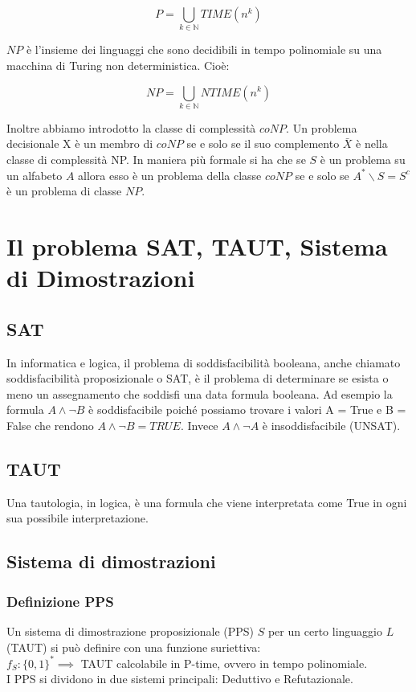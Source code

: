 \documentclass[it]{article}
\begin{document}
	$$ P = \bigcup\limits_{k \in \mathbb{N}}TIME(n^k) $$

$ {\displaystyle NP} $ è l'insieme dei linguaggi che sono decidibili in tempo polinomiale su una macchina di Turing non deterministica. Cioè:

    $$ NP = \bigcup\limits_{k \in \mathbb{N}}NTIME(n^k) $$
    
Inoltre abbiamo introdotto la classe di complessità $ {\displaystyle coNP} $. Un problema decisionale X è un membro di $ {\displaystyle coNP} $ se e solo se il suo complemento $ \bar{X} $ è nella classe di complessità NP. In maniera più formale si ha che se $ {\displaystyle S} $ è un problema su un alfabeto $ {\displaystyle A} $ allora esso è un problema della classe $ {\displaystyle coNP} $ se e solo se $ {\displaystyle A^{*}\backslash S=S^{c}} $ è un problema di classe $ {\displaystyle NP}$. 

\section{Il problema SAT, TAUT, Sistema di Dimostrazioni}
    \subsection{SAT}
    In informatica e logica, il problema di soddisfacibilità booleana, anche chiamato soddisfacibilità proposizionale o SAT, è il problema di determinare se esista o meno un assegnamento che soddisfi una data formula booleana. Ad esempio la formula $A \land \lnot B$ è soddisfacibile poiché possiamo trovare i valori A = True e B = False che rendono $A \land \lnot B = TRUE$. Invece $A \land \lnot A$ è insoddisfacibile (UNSAT).
    \subsection{TAUT}
    Una tautologia, in logica, è una formula che viene interpretata come True in ogni sua possibile interpretazione.
    \subsection{Sistema di dimostrazioni}
        \subsubsection{Definizione PPS} Un sistema di dimostrazione proposizionale (PPS) $ {\displaystyle S} $ per un certo
        linguaggio $ {\displaystyle L} $ (TAUT) si può definire con una funzione suriettiva:\\ $f_{S} :\{0,1\}^{*} \implies$ TAUT calcolabile in P-time, ovvero in tempo polinomiale.\\
        I PPS si dividono in due sistemi principali: Deduttivo e Refutazionale.
\end{document}

